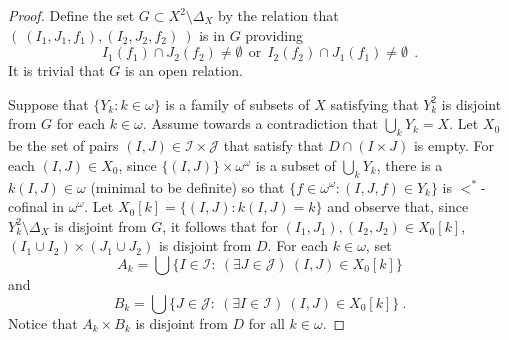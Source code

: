 \documentclass{amsart}
\theoremstyle{definition}
\theoremstyle{remark}
\begin{document}
\begin{proof}
Define the set $G\subset X^2\setminus \Delta_X$ by
the relation that $( ~ (I_1,J_1,f_1), (I_2,J_2,f_2)~)$ is in $G$
providing 
 $$I_1(f_1)\cap J_2(f_2)\neq\emptyset \ \ \mbox{or}\ \  
 I_2(f_2)\cap J_1(f_1)\neq\emptyset~~.$$ 
 It is trivial that $G$ is an open relation. 

 Suppose that $\{ Y_k : k\in \omega \} $ is a family of subsets
 of $X$ satisfying that $Y_k^2 $ is disjoint
 from $G$ for each $k\in\omega$. Assume towards a contradiction
 that $\bigcup_k Y_k = X$. 
   Let $X_0 $ be the set of pairs $(I,J)\in \mathcal I\times \mathcal J$
   that satisfy that $D\cap (I\times J)$ is empty. 
   For each $(I,J)\in X_0$, 
   since $\{(I,J)\}\times \omega^{\omega}$ is
   a subset of $\bigcup_k Y_k$,
there is a $k(I,J)\in\omega$ (minimal to be definite) so
   that $\{ f\in \omega^{\omega} : (I,J,f)\in Y_k\}$ 
   is $<^*$-cofinal in $\omega^\omega$. 
   Let $X_0[k] = \{ (I,J) : k(I,J) = k\}$ and observe
   that, since $Y_k^2\setminus \Delta_X$ is disjoint from $G$,
   it follows that
   for $(I_1,J_1),(I_2,J_2)\in X_0[k]$,
    $(I_1\cup I_2)\times (J_1\cup J_2)$ is disjoint
    from $D$. For each $k\in \omega$, set 
    $$A_k = \bigcup \{ I\in \mathcal I : ~(\exists J\in \mathcal J)~ (I,J)\in X_0[k]\}$$
    and
    $$B_k = \bigcup \{ J\in \mathcal J : ~(\exists I\in \mathcal I)~(I,J)\in X_0[k]\}~.$$
    Notice that $A_k\times B_k$ is disjoint from $D$ for all $k\in \omega$.
 

\end{proof}
\end{document}
